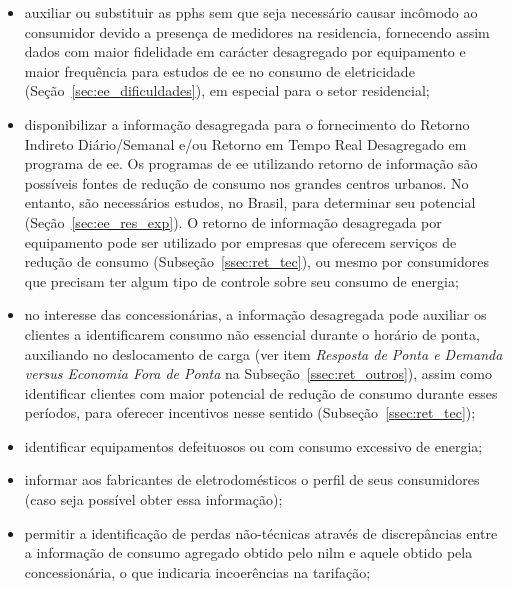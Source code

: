 \begin{itemize}
\item auxiliar ou substituir as \glspl{pph} sem que seja necessário
causar incômodo ao consumidor devido a presença de medidores na
residencia, fornecendo assim dados com maior fidelidade em carácter
desagregado por equipamento e maior frequência para estudos de \gls{ee}
no consumo de eletricidade (Seção~\ref{sec:ee_dificuldades}), em
especial para o setor residencial;
\item disponibilizar a informação desagregada para o fornecimento do
Retorno Indireto Diário/Semanal e/ou Retorno em Tempo Real Desagregado
em programa de \gls{ee}. Os programas de \gls{ee} utilizando retorno
de informação são possíveis fontes de redução de consumo nos grandes
centros urbanos. No entanto, são necessários estudos, no Brasil, para
determinar seu potencial (Seção~\ref{sec:ee_res_exp}). O retorno de
informação desagregada por equipamento pode ser utilizado por empresas
que oferecem serviços de redução de consumo
(Subseção~\ref{ssec:ret_tec}), ou mesmo por consumidores que precisam
ter algum tipo de controle sobre seu consumo de energia;
\item no interesse das concessionárias, a informação desagregada pode auxiliar
  os clientes a identificarem consumo não essencial durante o horário de ponta,
  auxiliando no deslocamento de carga (ver item \emph{Resposta de Ponta e
  Demanda versus Economia Fora de Ponta} na Subseção~\ref{ssec:ret_outros}),
  assim como identificar clientes com maior potencial de redução de consumo
  durante esses períodos, para oferecer incentivos nesse sentido
  (Subseção~\ref{ssec:ret_tec});
\item identificar equipamentos defeituosos ou com consumo excessivo de
energia;
\item informar aos fabricantes de eletrodomésticos o perfil de seus consumidores
  (caso seja possível obter essa informação);
\item permitir a identificação de perdas não-técnicas através de discrepâncias
  entre a informação de consumo agregado obtido pelo \acs{nilm} e aquele obtido
  pela concessionária, o que indicaria incoerências na tarifação;
\end{itemize}

